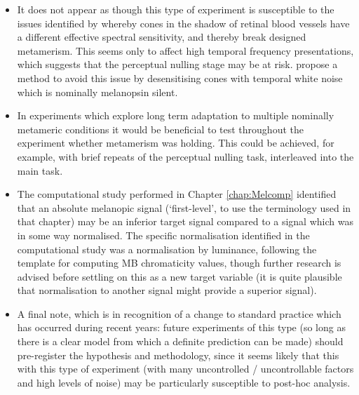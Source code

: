 \begin{itemize}
\item It does not appear as though this type of experiment is susceptible to the issues identified by \citet{spitschan_selective_2015} whereby cones in the shadow of retinal blood vessels have a different effective spectral sensitivity, and thereby break designed metamerism. This seems only to affect high temporal frequency presentations, which suggests that the perceptual nulling stage may be at risk. \citet{zele_melanopsin_2018} propose a method to avoid this issue by desensitising cones with temporal white noise which is nominally melanopsin silent.
\item In experiments which explore long term adaptation to multiple nominally metameric conditions it would be beneficial to test throughout the experiment whether metamerism was holding. This could be achieved, for example, with brief repeats of the perceptual nulling task, interleaved into the main task.
\item The computational study performed in Chapter \ref{chap:Melcomp} identified that an absolute melanopic signal (`first-level', to use the terminology used in that chapter) may be an inferior target signal compared to a signal which was in some way normalised. The specific normalisation identified in the computational study was a normalisation by luminance, following the template for computing \gls{MB} chromaticity values, though further research is advised before settling on this as a new target variable (it is quite plausible that normalisation to another signal might provide a superior signal).
\item A final note, which is in recognition of a change to standard practice which has occurred during recent years: future experiments of this type (so long as there is a clear model from which a definite prediction can be made) should pre-register the hypothesis and methodology, since it seems likely that this with this type of experiment (with many uncontrolled / uncontrollable factors and high levels of noise) may be particularly susceptible to post-hoc analysis.
\end{itemize}





